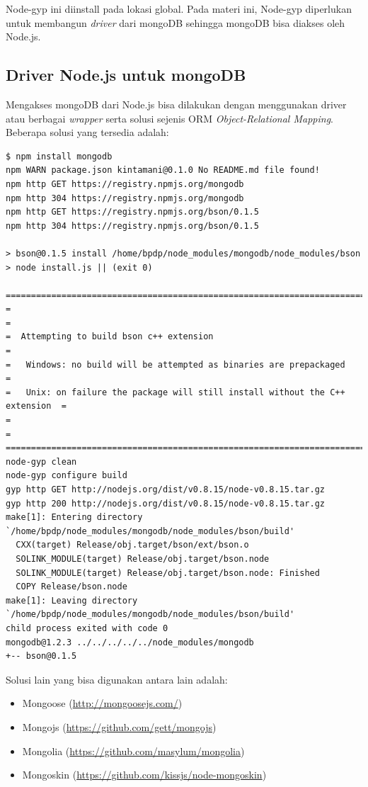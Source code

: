 Node-gyp ini diinstall pada lokasi global. Pada materi ini, Node-gyp diperlukan untuk membangun \textit{driver} dari mongoDB sehingga mongoDB bisa diakses oleh Node.js. 

\subsection{Driver Node.js untuk mongoDB}

Mengakses mongoDB dari Node.js bisa dilakukan dengan menggunakan driver atau berbagai \textit{wrapper} serta solusi sejenis ORM \textit{Object-Relational Mapping}. Beberapa solusi yang tersedia adalah:
\lstset{language=bash,caption=Instalasi driver mongoDB}
\begin{lstlisting}
$ npm install mongodb
npm WARN package.json kintamani@0.1.0 No README.md file found!
npm http GET https://registry.npmjs.org/mongodb
npm http 304 https://registry.npmjs.org/mongodb
npm http GET https://registry.npmjs.org/bson/0.1.5
npm http 304 https://registry.npmjs.org/bson/0.1.5

> bson@0.1.5 install /home/bpdp/node_modules/mongodb/node_modules/bson
> node install.js || (exit 0)

================================================================================
=                                                                              =
=  Attempting to build bson c++ extension                                      =
=   Windows: no build will be attempted as binaries are prepackaged            =
=   Unix: on failure the package will still install without the C++ extension  =
=                                                                              =
================================================================================
node-gyp clean
node-gyp configure build
gyp http GET http://nodejs.org/dist/v0.8.15/node-v0.8.15.tar.gz
gyp http 200 http://nodejs.org/dist/v0.8.15/node-v0.8.15.tar.gz
make[1]: Entering directory `/home/bpdp/node_modules/mongodb/node_modules/bson/build'
  CXX(target) Release/obj.target/bson/ext/bson.o
  SOLINK_MODULE(target) Release/obj.target/bson.node
  SOLINK_MODULE(target) Release/obj.target/bson.node: Finished
  COPY Release/bson.node
make[1]: Leaving directory `/home/bpdp/node_modules/mongodb/node_modules/bson/build'
child process exited with code 0
mongodb@1.2.3 ../../../../../node_modules/mongodb
+-- bson@0.1.5
\end{lstlisting}

Solusi lain yang bisa digunakan antara lain adalah:
\begin{itemize}
	\item Mongoose (\url{http://mongoosejs.com/})
	\item Mongojs (\url{https://github.com/gett/mongojs})
	\item Mongolia (\url{https://github.com/masylum/mongolia})
	\item Mongoskin (\url{https://github.com/kissjs/node-mongoskin})
\end{itemize}

